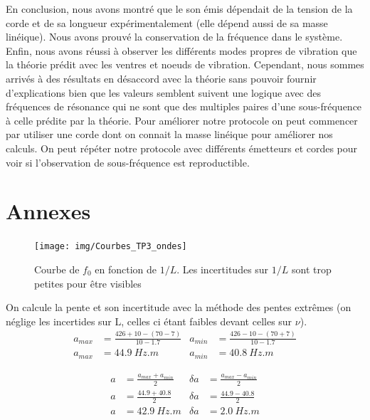 \documentclass[11pt]{article}
\begin{document}
En conclusion, nous avons montré que le son émis dépendait de la tension de la corde et de sa longueur expérimentalement (elle dépend aussi de sa masse linéique). Nous avons prouvé la conservation de la fréquence dans le système.
Enfin, nous avons réussi à observer les différents modes propres de vibration que la théorie prédit avec les ventres et noeuds de vibration. Cependant, nous sommes arrivés à des résultats en désaccord avec la théorie
sans pouvoir fournir d'explications bien que les valeurs semblent suivent une logique avec des fréquences de résonance qui ne sont que des multiples paires d'une sous-fréquence à celle prédite par la théorie. 
Pour améliorer notre protocole on peut commencer par utiliser une corde dont on connait la masse linéique pour améliorer nos calculs. 
On peut répéter notre protocole avec différents émetteurs et cordes pour voir si l'observation de sous-fréquence est reproductible.

\newpage

\section*{Annexes}

\begin{figure}[h!]
    \begin{center}
        \texttt{[image: img/Courbes\_TP3\_ondes]}
        \caption{Courbe de $f_0$ en fonction de $1/L$. Les incertitudes sur $1/L$ sont trop petites pour être visibles}
        \label{img:Courbe_derniere_expérience}
    \end{center}
\end{figure}

On calcule la pente et son incertitude avec la méthode des pentes extrêmes (on néglige les incertides sur L, celles ci étant faibles devant celles sur $\nu$). 
\begin{align*}
    a_{max} &=\frac{426+10-(70-7)}{10-1.7} & a_{min} &=\frac{426-10-(70+7)}{10-1.7} \\
    a_{max} &=44.9 \ Hz.m & a_{min} &= 40.8 \ Hz.m
\end{align*}

\begin{align*}
    a&=\frac{a_{max} + a_{min}}{2} &\delta a &= \frac{a_{max} - a_{min}}{2} \\
    a&=\frac{44.9 + 40.8}{2} &\delta a &= \frac{44.9 - 40.8}{2} \\
    a&= 42.9 \ Hz.m &\delta a &= 2.0 \ Hz.m
\end{align*}
\end{document}
